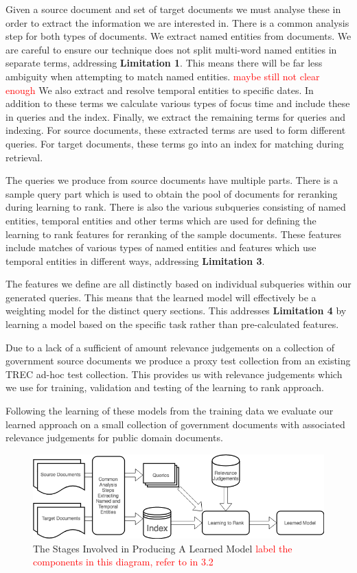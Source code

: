 \documentclass{mpaper}
\newcommand{\remove}[1]{\textcolor{red}{#1}}
\begin{document}
Given a source document and set of target documents we must analyse these in order to extract the information we are interested in.
There is a common analysis step for both types of documents.
We extract named entities from documents. We are careful to ensure our technique does not split multi-word named entities in separate terms, addressing \textbf{Limitation 1}. This means there will be far less ambiguity when attempting to match named entities. \remove{maybe still not clear enough}
We also extract and resolve temporal entities to specific dates.
In addition to these terms we calculate various types of focus time and include these in queries and the index.
Finally, we extract the remaining terms for queries and indexing.
For source documents, these extracted terms are used to form different queries.
For target documents, these terms go into an index for matching during retrieval.

The queries we produce from source documents have multiple parts.
There is a sample query part which is used to obtain the pool of documents for reranking during learning to rank.
There is also the various subqueries consisting of named entities, temporal entities and other terms which are used for defining the learning to rank features for reranking of the sample documents.
These features include matches of various types of named entities and features which use temporal entities in different ways, addressing \textbf{Limitation 3}.

The features we define are all distinctly based on individual subqueries within our generated queries. This means that the learned model will effectively be a weighting model for the distinct query sections. This addresses \textbf{Limitation 4} by learning a model based on the specific task rather than pre-calculated features.

Due to a lack of a sufficient of amount relevance judgements on a collection of government source documents we produce a proxy test collection from an existing TREC ad-hoc test collection. This provides us with relevance judgements which we use for training, validation and testing of the learning to rank approach.

Following the learning of these models from the training data we evaluate our learned approach on a small collection of government documents with associated relevance judgements for public domain documents.

\begin{figure}
\begin{center}
\includegraphics[scale=0.5]{5yp.png}
\end{center}
\caption{\label{fig:approach} The Stages Involved in Producing A Learned Model \remove{label the components in this diagram, refer to in 3.2}}
\end{figure}
\end{document}
